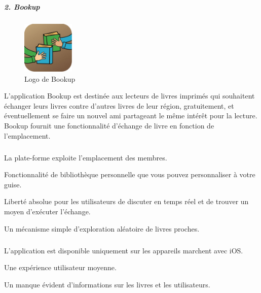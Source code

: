 \subparagraph{{\large 2. Bookup}\medskip \\}

\begin{figure}
		\vspace{20pt}
		\includegraphics[width=2.5cm]{Images/chapter1/bookUpLogo.jpg}
		\vspace{-20pt}
		\caption{{\footnotesize Logo de Bookup}}
\end{figure}

L'application Bookup est destinée aux lecteurs de livres imprimés qui souhaitent échanger leurs livres contre d'autres livres de leur région, gratuitement, et éventuellement se faire un nouvel ami partageant le même intérêt pour la lecture. Bookup fournit une fonctionnalité d’échange de livre en fonction de l’emplacement.\cite{noauthor_bookup_nodate-1}\\

\subparagraph*{}
\begin{list}{•}{\textbf{Avantages}}
	\item La plate-forme exploite l'emplacement des membres.
	\item Fonctionnalité de bibliothèque personnelle que vous pouvez personnaliser à votre guise.
	\item Liberté absolue pour les utilisateurs de discuter en temps réel et de trouver un moyen d'exécuter l'échange.
	\item Un mécanisme simple d'exploration aléatoire de livres proches.
\end{list}

\subparagraph*{}
\begin{list}{•}{\textbf{Inconvénients}}
	\item L'application est disponible uniquement sur les appareils marchent avec iOS.
	\item Une expérience utilisateur moyenne.
	\item Un manque évident d'informations sur les livres et les utilisateurs.
\end{list}

